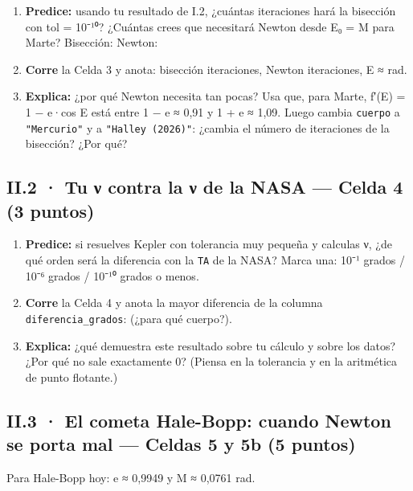 \begin{enumerate}
\def\labelenumi{\alph{enumi})}
\item
  \textbf{Predice:} usando tu resultado de I.2, ¿cuántas iteraciones hará la bisección con tol = 10⁻¹⁰? ¿Cuántas crees que necesitará Newton desde E₀ = M para Marte?
  Bisección:  Newton: 
\item
  \textbf{Corre} la Celda 3 y anota: bisección  iteraciones, Newton  iteraciones, E ≈  rad.
\item
  \textbf{Explica:} ¿por qué Newton necesita tan pocas? Usa que, para Marte, f′(E) = 1 − e·cos E está entre 1 − e ≈ 0,91 y 1 + e ≈ 1,09. Luego cambia \texttt{cuerpo} a \texttt{"Mercurio"} y a \texttt{"Halley\ (2026)"}: ¿cambia el número de iteraciones de la bisección? ¿Por qué?
\end{enumerate}

\subsection{II.2 · Tu ν contra la ν de la NASA --- Celda 4 (3 puntos)}

\begin{enumerate}
\def\labelenumi{\alph{enumi})}
\item
  \textbf{Predice:} si resuelves Kepler con tolerancia muy pequeña y calculas ν, ¿de qué orden será la diferencia con la \texttt{TA} de la NASA? Marca una: 10⁻¹ grados / 10⁻⁶ grados / 10⁻¹⁰ grados o menos.
\item
  \textbf{Corre} la Celda 4 y anota la mayor diferencia de la columna \texttt{diferencia\_grados}:  (¿para qué cuerpo?).
\item
  \textbf{Explica:} ¿qué demuestra este resultado sobre tu cálculo y sobre los datos? ¿Por qué no sale exactamente 0? (Piensa en la tolerancia y en la aritmética de punto flotante.)
\end{enumerate}

\subsection{II.3 · El cometa Hale-Bopp: cuando Newton se porta mal --- Celdas 5 y 5b (5 puntos)}

Para Hale-Bopp hoy: e ≈ 0,9949 y M ≈ 0,0761 rad.


